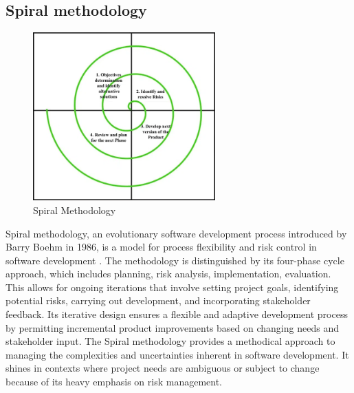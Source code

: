 \subsection{Spiral methodology}
\begin{figure}[H]
    \centering
    \includegraphics[width=7cm]{Images/spiral.png}
    \caption{Spiral Methodology \citep{kumarpal_2018_software}}
    \label{fig:spiral}
\end{figure}
Spiral methodology, an evolutionary software development process introduced by Barry Boehm in 1986, is a model for process flexibility and risk control in software development \citep{boehm_1986_a}.
The methodology is distinguished by its four-phase cycle approach, which includes planning, risk analysis, implementation, evaluation.
This allows for ongoing iterations that involve setting project goals, identifying potential risks, carrying out development, and incorporating stakeholder feedback.
Its iterative design ensures a flexible and adaptive development process by permitting incremental product improvements based on changing needs and stakeholder input.
The Spiral methodology provides a methodical approach to managing the complexities and uncertainties inherent in software development. 
It shines in contexts where project needs are ambiguous or subject to change because of its heavy emphasis on risk management. 


